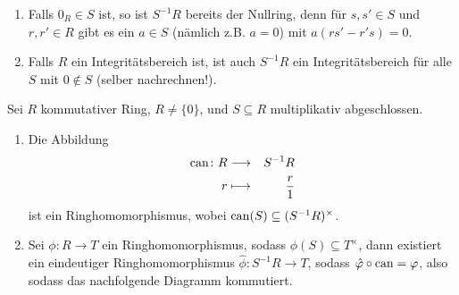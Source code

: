 \documentclass[12pt,a4paper]{scrartcl}
\begin{document}
\begin{bem}
	\leavevmode
	\begin{enumerate}
		\item Falls $0_R\in S$ ist, so ist $S^{-1}R$ bereits der Nullring, denn für $s,s'\in S$ und $r,r'\in R$ gibt es ein $a\in S$ (nämlich z.B. $a = 0$) mit  $a(rs'-r's) = 0$.
		\item Falls $R$ ein Integritätsbereich ist, ist auch $S^{-1}R$ ein Integritätsbereich für alle $S$ mit $0\notin S$ (selber nachrechnen!).
	\end{enumerate}
\end{bem}

\begin{satz} \label{thm:unieig_lokali}
	Sei $R$ kommutativer Ring, $R\neq\{0\}$, und $S\subseteq R$ multiplikativ abgeschlossen.
	\begin{enumerate}
		\item Die Abbildung
				\begin{eqnarray*}
					\operatorname{can}\colon R & \longrightarrow & S^{-1}R\\
					r & \longmapsto & \frac r1
				\end{eqnarray*}
			ist ein Ringhomomorphismus, wobei $\operatorname{can}(S) \subseteq(S^{-1}R)^{\times}$.
		\item Sei $\phi\colon R\to T$ ein Ringhomomorphismus, sodass $\phi(S) \subseteq T^{\times}$, dann existiert ein eindeutiger Ringhomomorphismus $\hat{\phi}\colon S^{-1}R\to T$, sodass
		$\hat{\varphi}\circ \operatorname{can} = \varphi$, also sodass das nachfolgende Diagramm kommutiert.
		\begin{center}
		\end{center}
	\end{enumerate}
\end{satz}
\end{document}
